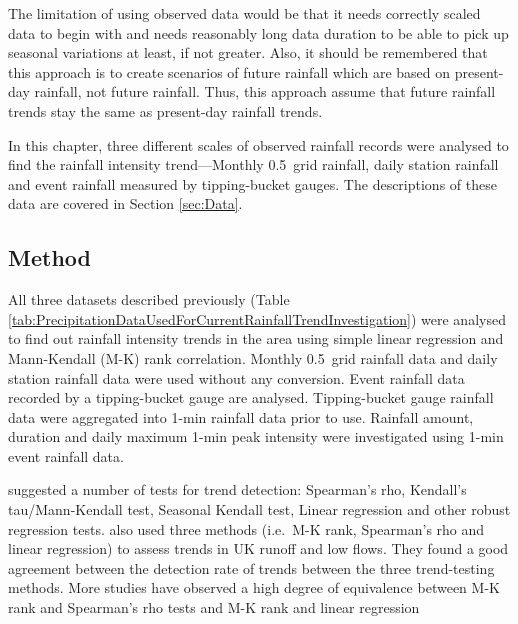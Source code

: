 The limitation of using observed data would be that it needs correctly scaled
data to begin with and needs reasonably long data duration to be able to pick up
seasonal variations at least, if not greater. Also, it should be remembered that
this approach is to create scenarios of future rainfall which are based on
present-day rainfall, not future rainfall. Thus, this approach assume that
future rainfall trends stay the same as present-day rainfall trends.

In this chapter, three different scales of observed rainfall records were
analysed to find the rainfall intensity trend---Monthly 0.5\textdegree\ grid
rainfall, daily station rainfall and event rainfall measured by tipping-bucket
gauges. The descriptions of these data are covered in Section \ref{sec:Data}.

\subsection{Method}
\label{sec:MethodsObservedRainfallCharacteristicInvestigation}
All three datasets described previously (Table
\ref{tab:PrecipitationDataUsedForCurrentRainfallTrendInvestigation}) were
analysed to find out rainfall intensity trends in the area using simple linear
regression and Mann-Kendall (M-K) rank correlation. Monthly 0.5\textdegree\ grid
rainfall data and daily station rainfall data were used without any conversion.
Event rainfall data recorded by a tipping-bucket gauge are analysed.
Tipping-bucket gauge rainfall data were aggregated into 1-min rainfall data
prior to use. Rainfall amount, duration and daily maximum 1-min peak intensity
were investigated using 1-min event rainfall data.

\citet{kundzewicz2004-7} suggested a number of tests for trend detection:
Spearman's rho, Kendall's tau/Mann-Kendall test, Seasonal Kendall test, Linear
regression and other robust regression tests.
\citet{hannaford2006-1237} also used three methods (i.e.\ M-K rank, Spearman's
rho and linear regression) to assess trends in UK runoff and low flows. They
found a good agreement between the detection rate of trends between the three
trend-testing methods.
More studies have observed a high degree of equivalence between M-K rank and
Spearman's rho tests \citep{yue2002-254} and M-K rank and linear regression
\citep{svensson2005-811}

